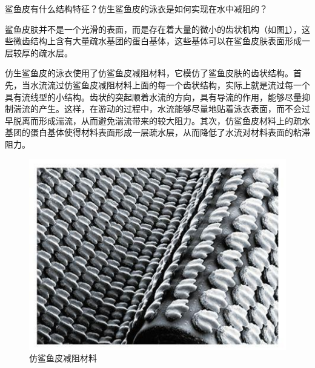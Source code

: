 \documentclass{assignment}
\begin{document}
\begin{ti}
    鲨鱼皮有什么结构特征？仿生鲨鱼皮的泳衣是如何实现在水中减阻的？
\end{ti}
\begin{da}
    鲨鱼皮肤并不是一个光滑的表面，而是存在着大量的微小的齿状机构（如图\ref{Shark-skin}），这些微齿结构上含有大量疏水基团的蛋白基体，这些基体可以在鲨鱼皮肤表面形成一层较厚的疏水层\cite{Wang2019Application-and-prospect-of-new-bionic-materials}。

    仿生鲨鱼皮的泳衣使用了仿鲨鱼皮减阻材料，它模仿了鲨鱼皮肤的齿状结构。首先，当水流流过仿鲨鱼皮减阻材料上面的每一个齿状结构，实际上就是流过每一个具有流线型的小结构。齿状的突起顺着水流的方向，具有导流的作用，能够尽量抑制湍流的产生。这样，在游动的过程中，水流能够尽量地贴着泳衣表面，而不会过早脱离而形成湍流，从而避免湍流带来的较大阻力。其次，仿鲨鱼皮材料上的疏水基团的蛋白基体使得材料表面形成一层疏水层，从而降低了水流对材料表面的粘滞阻力。
    \begin{figure}[H]
        \centering
        \includegraphics[width=.45\columnwidth]{Shark-skin.jpg}
        \caption{仿鲨鱼皮减阻材料}
        \label{Shark-skin}
    \end{figure}
\end{da}
\end{document}
